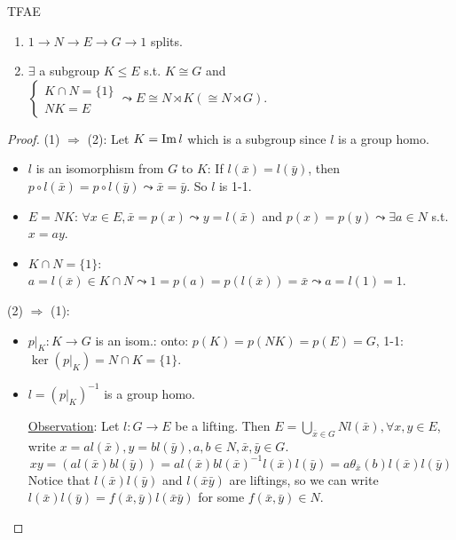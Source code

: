 \begin{prop} TFAE
  \begin{enumerate}
    \item $1\to N\to E\to G\to 1$ splits.
    \item $\exists$ a subgroup $K \le E$ s.t. $K \cong G$ and
      $\begin{cases} K \cap N = \{1\} \\ NK = E\end{cases}
      \leadsto E \cong N \rtimes K (\cong N \rtimes G)$.
  \end{enumerate}
  \begin{proof}
    (1) $\Rightarrow$ (2): Let $K = \operatorname{Im} l$ which is a subgroup since $l$
    is a group homo.
    \begin{itemize}
      \item $l$ is an isomorphism from $G$ to $K$: If $l(\bar{x}) = l(\bar{y})$, then
        $p \circ l(\bar{x}) = p\circ l(\bar{y}) \leadsto \bar{x} = \bar{y}$.
        So $l$ is 1-1.
      \item $E = NK$: $\forall x \in E, \bar{x} = p(x) \leadsto
        y = l(\bar{x})$ and $p(x) = p(y) \leadsto \exists a \in N$ s.t.
        $x = ay$.
      \item $K \cap N = \{1\}$:
        $a = l(\bar{x}) \in K \cap N \leadsto 1 = p(a) = p(l(\bar{x})) = \bar{x}
        \leadsto a = l(1) = 1$.
    \end{itemize}

    (2) $\Rightarrow$ (1):
    \begin{itemize}
      \item $p \big|_K: K \to G$ is an isom.:
        onto: $p(K) = p(NK) = p(E) = G$, 1-1: $\ker(p\big|_K) = N \cap K = \{1\}$.
      \item $l = \left(p\big|_K\right)^{-1}$ is a group homo.

        \underline{Observation}: Let $l: G\to E$ be a lifting.
        Then $E = \bigcup_{\bar{x}\in G} Nl(\bar{x}), \forall x, y \in E$,
        write $x = al(\bar{x}), y = bl(\bar{y}), a, b\in N, \bar{x},\bar{y}\in G$.
        \[
          xy = (al(\bar{x})bl(\bar{y})) = al(\bar{x})bl(\bar{x})^{-1}l(\bar{x})l(\bar{y})
          = a \theta_{\bar{x}}(b)l(\bar{x})l(\bar{y})
        \]
        Notice that $l(\bar{x})l(\bar{y})$ and $l(\bar{x}\bar{y})$ are liftings,
        so we can write $l(\bar{x})l(\bar{y}) = f(\bar{x}, \bar{y})l(\bar{x}\bar{y})$
        for some $f(\bar{x}, \bar{y})\in N$.
        \qedhere
    \end{itemize}
  \end{proof}
\end{prop}

